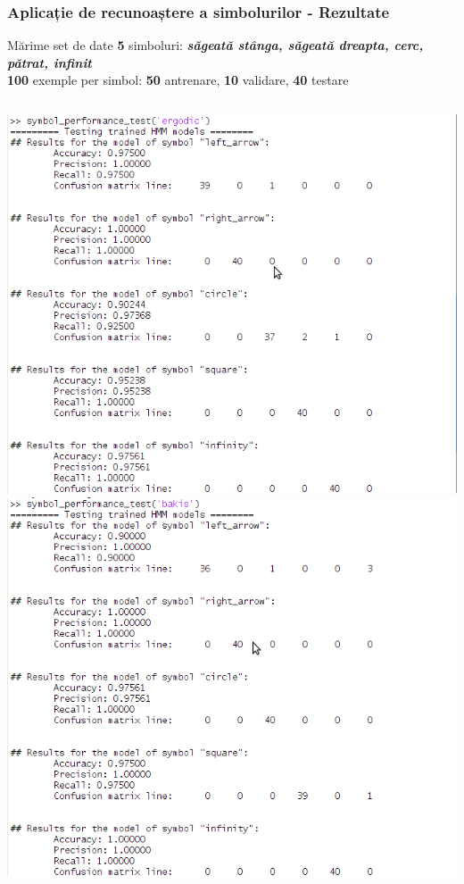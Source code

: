 \begin{frame}[t]
	\frametitle{Aplicație de recunoaștere a simbolurilor - Rezultate}
	\scriptsize
	\begin{block}{Mărime set de date}
		\textbf{5} simboluri: \textbf{\emph{săgeată stânga, săgeată dreapta, cerc, pătrat, infinit}}\\
		\textbf{100} exemple per simbol: \textbf{50} antrenare, \textbf{10} validare, \textbf{40} testare
	\end{block}
	\normalsize
	
	\begin{columns}[T]
		\includegraphics[width=\textwidth]{graphics/demo-app/results-ergodic.png}
		\includegraphics[width=\textwidth]{graphics/demo-app/results-bakis.png}
	\end{columns}
\end{frame}